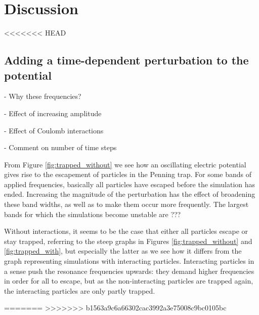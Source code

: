 \section{Discussion}\label{sec:discussion}


<<<<<<< HEAD

\subsection{Adding a time-dependent perturbation to the potential}

\par - Why these frequencies?
\par - Effect of increasing amplitude
\par - Effect of Coulomb interactions
\par - Comment on number of time steps

From Figure \ref{fig:trapped_without} we see how an oscillating electric potential gives rise to the escapement of particles in the Penning trap. For some bands of applied frequencies, basically all particles have escaped before the simulation has ended. Increasing the magnitude of the perturbation has the effect of broadening these band widths, as well as to make them occur more frequently. The largest bands for which the simulations become unstable are ???

Without interactions, it seems to be the case that either all particles escape or stay trapped, referring to the steep graphs in Figures \ref{fig:trapped_without} and \ref{fig:trapped_with}, but especially the latter as we see how it differs from the graph representing simulations with interacting particles. Interacting particles in a sense push the resonance frequencies upwards: they demand higher frequencies in order for all to escape, but as the non-interacting particles are trapped again, the interacting particles are only partly trapped. 



=======
>>>>>>> b1563a9c6a66302cac3992a3e75008c9bc0105bc
